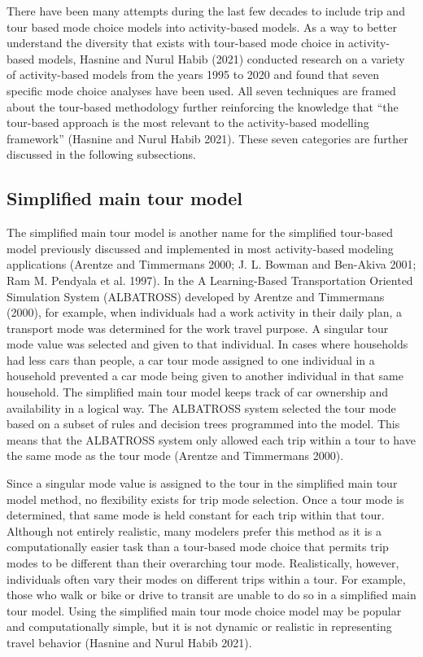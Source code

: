 \documentclass[12pt, oneside, openright]{byuthesis}
\begin{document}
There have been many attempts during the last few decades to include trip and tour based mode choice models into activity-based models. As a way to better understand the diversity that exists with tour-based mode choice in activity-based models, Hasnine and Nurul Habib (2021) conducted research on a variety of activity-based models from the years 1995 to 2020 and found that seven specific mode choice analyses have been used. All seven techniques are framed about the tour-based methodology further reinforcing the knowledge that ``the tour-based approach is the most relevant to the activity-based modelling framework'' (Hasnine and Nurul Habib 2021). These seven categories are further discussed in the following subsections.

\hypertarget{lit31}{%
\subsection{Simplified main tour model}\label{lit31}}

The simplified main tour model is another name for the simplified tour-based model previously discussed and implemented in most activity-based modeling applications (Arentze and Timmermans 2000; J. L. Bowman and Ben-Akiva 2001; Ram M. Pendyala et al. 1997). In the A Learning-Based Transportation Oriented Simulation System (ALBATROSS) developed by Arentze and Timmermans (2000), for example, when individuals had a work activity in their daily plan, a transport mode was determined for the work travel purpose. A singular tour mode value was selected and given to that individual. In cases where households had less cars than people, a car tour mode assigned to one individual in a household prevented a car mode being given to another individual in that same household. The simplified main tour model keeps track of car ownership and availability in a logical way. The ALBATROSS system selected the tour mode based on a subset of rules and decision trees programmed into the model. This means that the ALBATROSS system only allowed each trip within a tour to have the same mode as the tour mode (Arentze and Timmermans 2000).

Since a singular mode value is assigned to the tour in the simplified main tour model method, no flexibility exists for trip mode selection. Once a tour mode is determined, that same mode is held constant for each trip within that tour. Although not entirely realistic, many modelers prefer this method as it is a computationally easier task than a tour-based mode choice that permits trip modes to be different than their overarching tour mode. Realistically, however, individuals often vary their modes on different trips within a tour. For example, those who walk or bike or drive to transit are unable to do so in a simplified main tour model. Using the simplified main tour mode choice model may be popular and computationally simple, but it is not dynamic or realistic in representing travel behavior (Hasnine and Nurul Habib 2021).
\end{document}
